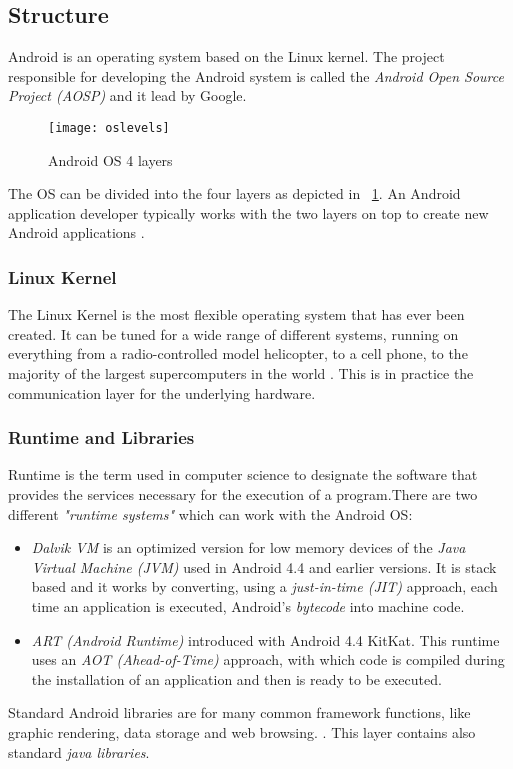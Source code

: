 \subsection{Structure}
\par
Android is an operating system based on the Linux kernel. The project responsible for developing the Android system is called the \textit{Android Open Source Project (AOSP)} and it lead by Google.
\begin{figure}[h]
	\centering
	\texttt{[image: oslevels]}
	\caption{Android OS 4 layers}
	\label{fig:2.3}
\end{figure}

The OS can be divided into the four layers as depicted in \figurename~\ref{fig:2.3}. An Android application developer typically works with the two layers on top to create new Android applications \cite{vogel2016android}.

\subsubsection{Linux Kernel} 
The Linux Kernel is the most flexible operating system that has ever been created. It can be tuned for a wide range of different systems, running on everything from a radio-controlled model helicopter, to a cell phone, to the majority of the largest supercomputers in the world \cite{hartman2006linux}. This is in practice the communication layer for the underlying hardware.
\subsubsection{Runtime and Libraries}
Runtime is the term used in computer science to designate the software that provides the services necessary for the execution of a program.There are two different \textit{"runtime systems"} which can work with the Android OS:
\begin{itemize}
	\item \textit{Dalvik VM} is an optimized version for low memory devices of the \textit{Java Virtual Machine (JVM)} used in Android 4.4 and earlier versions. It is stack based and it works by converting, using a \textit{just-in-time (JIT)} approach, each time an application is executed, Android's \textit{bytecode} into machine code.
	\item \textit{ART (Android Runtime)} introduced with Android 4.4 KitKat. This runtime uses an \textit{AOT (Ahead-of-Time)} approach, with which code is compiled during the installation of an application and then is ready to be executed.
\end{itemize}
\par Standard Android libraries are for many common framework functions, like graphic rendering, data storage and web browsing. \cite{vogel2016android}. This layer contains also standard \textit{java libraries}.
